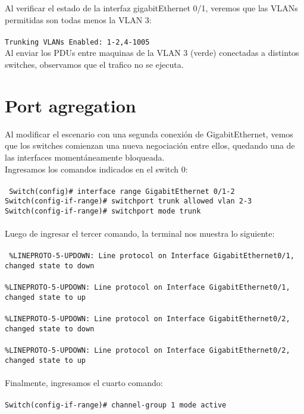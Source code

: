 \documentclass{article}
\begin{document}
Al verificar el estado de la interfaz gigabitEthernet 0/1, veremos que las VLANs permitidas son todas menos la VLAN 3: \\\\
\texttt{Trunking VLANs Enabled: 1-2,4-1005} \\

Al enviar los PDUs entre maquinas de la VLAN 3 (verde) conectadas a distintos switches, observamos que el trafico no se ejecuta. \\

\section{Port agregation}

Al modificar el escenario con una segunda conexión de GigabitEthernet, vemos que los switches comienzan una nueva negociación entre ellos, quedando una de las interfaces momentáneamente bloqueada. \\

Ingresamos los comandos indicados en el switch 0: \\\\
\texttt{
    Switch(config)\# interface range GigabitEthernet 0/1-2 \\
    Switch(config-if-range)\# switchport trunk allowed vlan 2-3 \\
    Switch(config-if-range)\# switchport mode trunk \\
} \\

Luego de ingresar el tercer comando, la terminal nos muestra lo siguiente: \\\\
\texttt{
    \%LINEPROTO-5-UPDOWN: Line protocol on Interface GigabitEthernet0/1, changed state to down \\\\
    \%LINEPROTO-5-UPDOWN: Line protocol on Interface GigabitEthernet0/1, changed state to up \\\\
    \%LINEPROTO-5-UPDOWN: Line protocol on Interface GigabitEthernet0/2, changed state to down \\\\
    \%LINEPROTO-5-UPDOWN: Line protocol on Interface GigabitEthernet0/2, changed state to up \\
} \\

Finalmente, ingresamos el cuarto comando: \\\\
\texttt{Switch(config-if-range)# channel-group 1 mode active} \\
\end{document}
